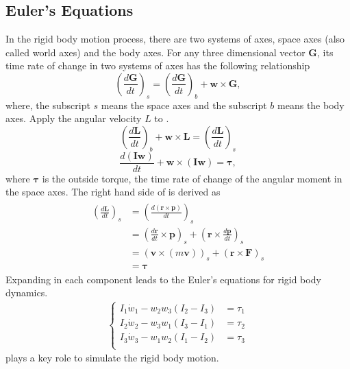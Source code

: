 \subsection*{Euler's Equations}
In the rigid body motion process, there are two systems of axes, 
space axes (also called world axes) and the body axes. 
For any three dimensional vector $\mathbf{G}$, its time rate of change 
in two systems of axes has the following relationship
\begin{equation}
(\frac{d\mathbf{G}}{dt})_s = (\frac{d\mathbf{G}}{dt})_b + \mathbf{w} \times \mathbf{G}, 
\label{eqn:time_rate_of_change}
\end{equation}
where, the subscript $s$ means the space axes and the subscript $b$ means 
the body axes. 
Apply the angular velocity $L$ to .
\begin{equation}
(\frac{d\mathbf{L}}{dt})_b + \mathbf{w} \times \mathbf{L} = (\frac{d\mathbf{L}}{dt})_s
\end{equation}
\begin{equation}
\frac{d(\mathbf{I}\mathbf{w})}{dt} + \mathbf{w} \times (\mathbf{I}\mathbf{w}) = \mathbf{\tau},
\label{eqn:eulers_equation1}
\end{equation}
where $\mathbf{\tau}$ is the outside torque, the time rate of change of 
the angular moment in the space axes. 
The right hand side of  is derived as 
\begin{eqnarray}
\begin{aligned}
(\frac{d\mathbf{L}}{dt})_s &= (\frac{d(\mathbf{r} \times \mathbf{p})}{dt})_s \\
&= (\frac{d\mathbf{r}}{dt} \times \mathbf{p})_s + (\mathbf{r} \times \frac{d\mathbf{p}}{dt})_s \\
&= (\mathbf{v} \times (m\mathbf{v}))_s + (\mathbf{r} \times \mathbf{F})_s \\
&= \mathbf{\tau}
\end{aligned}
\end{eqnarray}
Expanding  in each component leads to the 
Euler's equations for rigid body dynamics.
\begin{eqnarray}
\left\{
\begin{aligned}
I_1 \dot{w}_1 - w_2 w_3 (I_2 - I_3) &= \tau_1 \\
I_2 \dot{w}_2 - w_3 w_1 (I_3 - I_1) &= \tau_2 \\
I_3 \dot{w}_3 - w_1 w_2 (I_1 - I_2) &= \tau_3 \\
\end{aligned}
\right.
\label{eqn:eulers_equation2}
\end{eqnarray}
 plays a key role to simulate the rigid body motion. 

